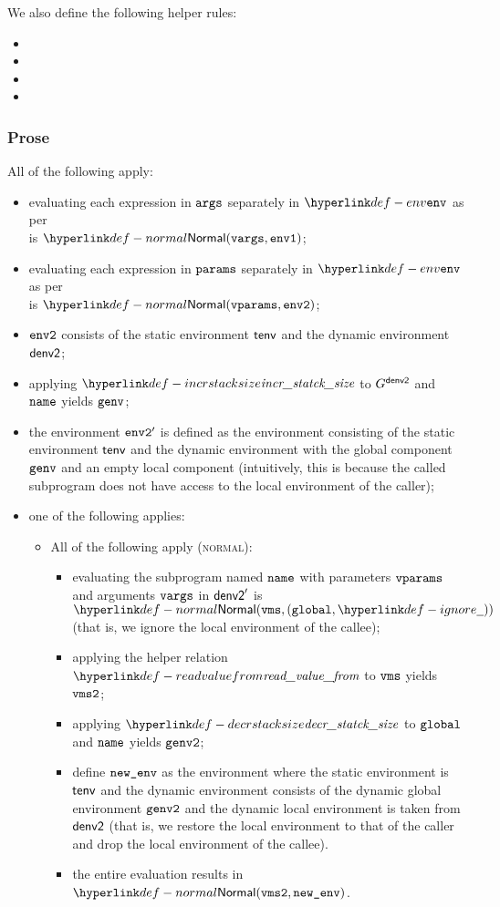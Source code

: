 We also define the following helper rules:
\begin{itemize}
  \item {}
  \item {}
  \item {}
  \item {}
\end{itemize}

\subsubsection{Prose}
All of the following apply:
\begin{itemize}
  \item evaluating each expression in $\texttt{args}$ separately in $\env$ as per \\
         is $\Normal(\vvargs, \envone)$\ProseOrAbnormal;
  \item evaluating each expression in $\texttt{params}$ separately in $\env$ as per\\
         is $\Normal(\vvparams, \envtwo)$\ProseOrAbnormal;
  \item $\texttt{env2}$ consists of the static environment $\textsf{tenv}$ and the dynamic environment $\textsf{denv2}$;
  \item applying $\incrstacksize$ to $G^{\textsf{denv2}}$ and $\texttt{name}$ yields $\texttt{genv}$;
  \item the environment $\texttt{env2}'$ is defined as the environment
  consisting of the static environment $\textsf{tenv}$ and the dynamic environment with the global component
  $\texttt{genv}$ and an empty local component (intuitively, this is because the called subprogram does not have access
  to the local environment of the caller);
  \item one of the following applies:
  \begin{itemize}
    \item All of the following apply (\textsc{normal}):
    \begin{itemize}
      \item evaluating the subprogram named $\texttt{name}$ with parameters $\texttt{vparams}$ and arguments $\texttt{vargs}$ in
      $\textsf{denv2}'$ is $\Normal(\vms, (\vglobal, \Ignore))$ (that is, we ignore the local environment
      of the callee)\ProseOrError;
      \item applying the helper relation $\readvaluefrom$ to $\texttt{vms}$ yields $\texttt{vms2}$;
      \item applying $\decrstacksize$ to $\texttt{global}$ and $\texttt{name}$ yields $\texttt{genv2}$;
      \item define $\texttt{new\_env}$ as the environment where the static environment is $\textsf{tenv}$ and the dynamic environment consists
            of the dynamic global environment $\texttt{genv2}$ and the dynamic local environment is taken from $\textsf{denv2}$
            (that is, we restore the local environment to that of the caller and drop the local environment of the callee).
      \item the entire evaluation results in $\Normal(\vmstwo, \newenv)$.
    \end{itemize}


\end{itemize}
\end{itemize}
